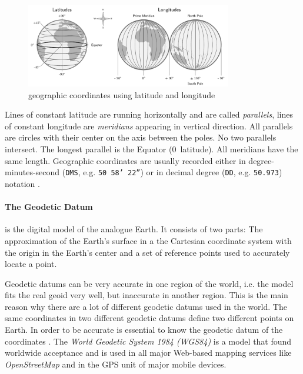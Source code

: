 \begin{figure}[ht]
  \vspace{1em}
  \centering
  \includegraphics[width=0.8\textwidth]{graphics/basics/geo_coordinates}
  \caption{geographic coordinates using latitude and longitude}
  \label{fig:geo-coordinates}
\end{figure}

Lines of constant latitude are running horizontally and are called \emph{parallels}, lines of constant longitude are \emph{meridians} appearing in vertical direction. All parallels are circles with their center on the axis between the poles. No two parallels intersect. The longest parallel is the Equator (0\degree~latitude). All meridians have the same length. Geographic coordinates are usually recorded either in degree-minutes-second (\texttt{DMS}, e.g. \texttt{50\degree~58' 22''}) or in decimal degree (\texttt{DD}, e.g. \texttt{50.973}) notation
\cite[pp. 30, 79]{bolstad2008gis}.


\paragraph{The Geodetic Datum} %
\label{par:geodetic_datum}

is the digital model of the analogue Earth. It consists of two parts: The approximation of the Earth's surface in a the Cartesian coordinate system with the origin in the Earth's center and a set of reference points used to accurately locate a point.

Geodetic datums can be very accurate in one region of the world, i.e. the model fits the real geoid very well, but inaccurate in another region. This is the main reason why there are a lot of different geodetic datums used in the world. The same coordinates in two different geodetic datums define two different points on Earth. In order to be accurate is essential to know the geodetic datum of the coordinates
\cite[p. 80]{bolstad2008gis}.
The \emph{World Geodetic System 1984 (WGS84)} is a model that found worldwide acceptance and is used in all major Web-based mapping services like \emph{OpenStreetMap} and in the GPS unit of major mobile devices.

